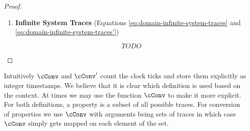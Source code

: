 \begin{proof}
\begin{enumerate}
\begin{enumerate}
                \item \textbf{Induction Step}

                Let $\sigma_\sys \in \trim(\Traces_\sys)$,
                with $\sigma_\sys \neq \emptytrace_\sys$
                .
                Then $\sigma_\sys = \tick^k \cdot D \cdot \sigma_\sys'$
                for some $k \geq 0$, $D \in \Databases$,
                and a suffix $\sigma_\sys' \in \trim(\Traces_\sys)$.
                \begin{align*}
                    \dConv'(\tau, \cConv'(\tau, \sigma_\sys)) &=
                    \dConv'(\tau, \cConv'(\tau, \tick^k \cdot D \cdot \sigma_\sys')) \\
                    &\stackrel{\ref{def:cconv'}}{=}
                        \dConv'(\tau, (\tau+k, D) \cdot \cConv'(\tau+k, \sigma_\sys')) \\
                    &\stackrel{\ref{def:dconv'}}{=}
                        \tick^k \cdot D \cdot
                        \dConv'(\tau+k, \cConv'(\tau+k, \sigma_\sys')) \\
                    &\stackrel{IH}{=}
                        \tick^k \cdot D \cdot \sigma_\sys' \\
                    &= \sigma_\sys
                \end{align*}
                
            \end{enumerate}

        
        \item \textbf{Infinite System Traces}
            (Equations \ref{eq:domain-infinite-system-traces} and 
            \ref{eq:domain-infinite-system-traces'})
            
        \begin{equation*}
            TODO
        \end{equation*}
        
    \end{enumerate}

\end{proof}
Intuitively $\cConv$ and $\cConv'$ count the clock ticks and store them
explicitly as integer timestamps.
We believe that it is clear which definition is used based on the context.
At times we may use the function $\cConv$ to make it more explicit.
For both definitions, a property is a subset of all possible traces.
For conversion of properties we use $\cConv$ with arguments being sets of
traces in which case $\cConv$ simply gets mapped on each element of the set.
